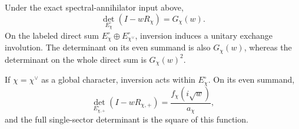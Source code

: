 \begin{proposition}
Under the exact spectral-annihilator input above,
\begin{equation}\label{eq:MasCharacterFull}
 \det_{E_\chi^\circ}(I-wR_\chi)=G_\chi(w).
\end{equation}
On the labeled direct sum $E_\chi^\circ\oplus E_{\chi^\vee}^\circ$, inversion induces a unitary exchange involution. The determinant on its even summand is also $G_\chi(w)$, whereas the determinant on the whole direct sum is $G_\chi(w)^2$.

If $\chi=\chi^\vee$ as a global character, inversion acts within $E_\chi^\circ$. On its even summand,
\begin{equation}\label{eq:MasCharacterSelfdual}
 \det_{E_{\chi,+}^\circ}(I-wR_{\chi,+})
 =\frac{f_\chi(i\sqrt w)}{a_\chi},
\end{equation}
and the full single-sector determinant is the square of this function.
\end{proposition}
